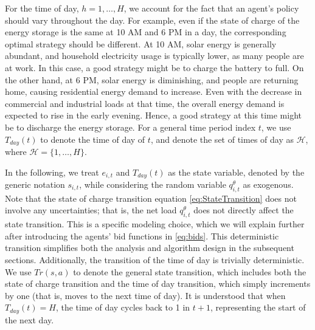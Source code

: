 \documentclass{article}
\theoremstyle{definition}
\theoremstyle{plain}
\begin{document}
For the time of day, $h = 1, \ldots, H$, we account for the fact that an agent's policy should vary throughout the day. For example, even if the state of charge of the energy storage is the same at 10 AM and 6 PM in a day, the corresponding optimal strategy should be different. At 10 AM, solar energy is generally abundant, and household electricity usage is typically lower, as many people are at work. In this case, a good strategy might be to charge the battery to full. On the other hand, at 6 PM, solar energy is diminishing, and people are returning home, causing residential energy demand to increase. Even with the decrease in commercial and industrial loads at that time, the overall energy demand is expected to rise in the early evening. Hence, a good strategy at this time might be to discharge the energy storage. For a general time period index $t$, we use $T_{day}(t)$ to denote the time of day of $t$, and denote the set of times of day as $\mathcal{H}$, where $\mathcal{H} = \{1, \ldots, H\}$.

In the following, we treat \( e_{i,t} \) and \( T_{day}(t) \) as the state variable, denoted by the generic notation \( s_{i,t} \), while considering the random variable \( q_{i,t}^{\theta} \) as exogenous. Note that the state of charge transition equation \eqref{eq:StateTransition} does not involve any uncertainties; that is, the net load \( q_{i,t}^{\theta} \) does not directly affect the state transition. This is a specific modeling choice, which we will explain further after introducing the agents' bid functions in \eqref{eq:bids}. This deterministic transition simplifies both the analysis and algorithm design in the subsequent sections. Additionally, the transition of the time of day is trivially deterministic. We use \( Tr(s, a) \) to denote the general state transition, which includes both the state of charge transition and the time of day transition, which simply increments by one (that is, moves to the next time of day). It is understood that when \( T_{day}(t) = H \), the time of day cycles back to 1 in $t+1$, representing the start of the next day.

\end{document}
